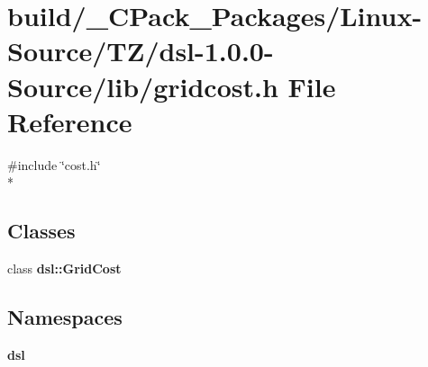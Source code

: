 \section{build/\-\_\-\-C\-Pack\-\_\-\-Packages/\-Linux-\/\-Source/\-T\-Z/dsl-\/1.0.0-\/\-Source/lib/gridcost.h File Reference}
\label{build_2__CPack__Packages_2Linux-Source_2TZ_2dsl-1_80_80-Source_2lib_2gridcost_8h}
{\ttfamily \#include \char`\"{}cost.\-h\char`\"{}}\\*
\subsection*{Classes}
\begin{DoxyCompactItemize}
\item 
class {\bf dsl\-::\-Grid\-Cost}
\end{DoxyCompactItemize}
\subsection*{Namespaces}
\begin{DoxyCompactItemize}
\item 
{\bf dsl}
\end{DoxyCompactItemize}
